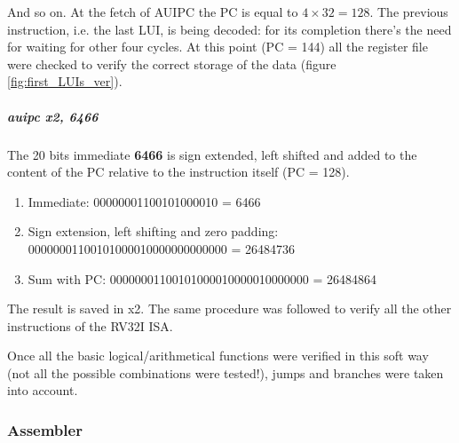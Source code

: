 \documentclass[a4paper]{article}
\begin{document}
And so on. At the fetch of AUIPC the PC is equal to $4 \times 32 = 128$. The previous instruction, i.e. the last LUI, is being decoded: for its completion there's the need for waiting for other four cycles. At this point (PC = 144) all the register file were checked to verify the correct storage of the data (figure \ref{fig:first_LUIs_ver}).

\subparagraph*{auipc x2, 6466} The 20 bits immediate \textbf{6466} is sign extended, left shifted and added to the content of the PC relative to the instruction itself (PC = 128).
\begin{enumerate}
\item Immediate: 00000001100101000010 = 6466
\item Sign extension, left shifting and zero padding: 00000001100101000010000000000000 = 26484736
\item Sum with PC: 00000001100101000010000010000000 = 26484864
\end{enumerate} 
The result is saved in x2. 
The same procedure was followed to verify all the other instructions of the RV32I ISA.

Once all the basic logical/arithmetical functions were verified in this soft way (not all the possible combinations were tested!), jumps and branches were taken into account.

\subsubsection{Assembler}\label{sec:assembler}
\end{document}

